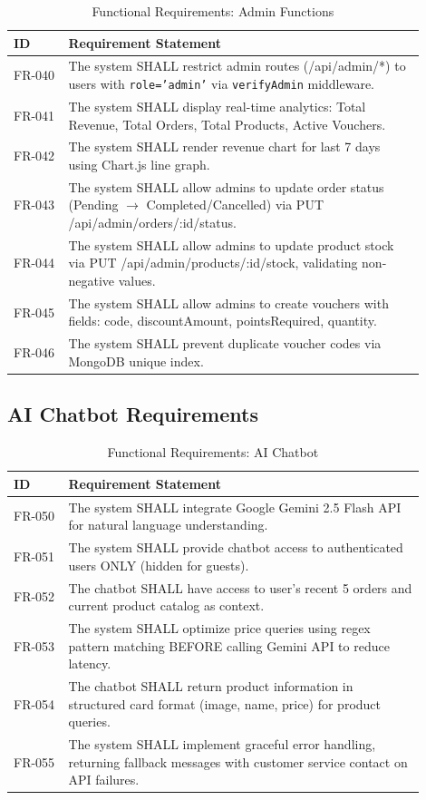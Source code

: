 \documentclass[12pt, a4paper]{report}
\begin{document}
\begin{table}[H]
\centering
\caption{Functional Requirements: Admin Functions}
\label{tab:fr_admin}
\small
\begin{tabular}{@{}p{0.12\linewidth}p{0.78\linewidth}@{}}
\toprule
\textbf{ID} & \textbf{Requirement Statement} \\
\midrule
FR-040 & The system SHALL restrict admin routes (/api/admin/*) to users with \texttt{role='admin'} via \texttt{verifyAdmin} middleware. \\
FR-041 & The system SHALL display real-time analytics: Total Revenue, Total Orders, Total Products, Active Vouchers. \\
FR-042 & The system SHALL render revenue chart for last 7 days using Chart.js line graph. \\
FR-043 & The system SHALL allow admins to update order status (Pending $\rightarrow$ Completed/Cancelled) via PUT /api/admin/orders/:id/status. \\
FR-044 & The system SHALL allow admins to update product stock via PUT /api/admin/products/:id/stock, validating non-negative values. \\
FR-045 & The system SHALL allow admins to create vouchers with fields: code, discountAmount, pointsRequired, quantity. \\
FR-046 & The system SHALL prevent duplicate voucher codes via MongoDB unique index. \\
\bottomrule
\end{tabular}
\end{table}

\subsection{AI Chatbot Requirements}

\begin{table}[H]
\centering
\caption{Functional Requirements: AI Chatbot}
\label{tab:fr_chatbot}
\small
\begin{tabular}{@{}p{0.12\linewidth}p{0.78\linewidth}@{}}
\toprule
\textbf{ID} & \textbf{Requirement Statement} \\
\midrule
FR-050 & The system SHALL integrate Google Gemini 2.5 Flash API for natural language understanding. \\
FR-051 & The system SHALL provide chatbot access to authenticated users ONLY (hidden for guests). \\
FR-052 & The chatbot SHALL have access to user's recent 5 orders and current product catalog as context. \\
FR-053 & The system SHALL optimize price queries using regex pattern matching BEFORE calling Gemini API to reduce latency. \\
FR-054 & The chatbot SHALL return product information in structured card format (image, name, price) for product queries. \\
FR-055 & The system SHALL implement graceful error handling, returning fallback messages with customer service contact on API failures. \\
\bottomrule
\end{tabular}
\end{table}
\end{document}
